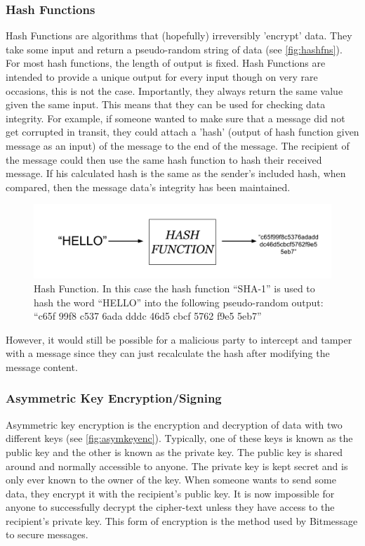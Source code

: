 \documentclass{article}
\begin{document}
\subsubsection{Hash Functions} \label{subsubsec:hashfns}
Hash Functions are algorithms that (hopefully) irreversibly 'encrypt' data. They take some input and return a pseudo-random string of data (see \autoref{fig:hashfns}). For most hash functions, the length of output is fixed. Hash Functions are intended to provide a unique output for every input though on very rare occasions, this is not the case. Importantly, they always return the same value given the same input. This means that they can be used for checking data integrity. For example, if someone wanted to make sure that a message did not get corrupted in transit, they could attach a 'hash' (output of hash function given message as an input) of the message to the end of the message. The recipient of the message could then use the same hash function to hash their received message. If his calculated hash is the same as the sender's included hash, when compared, then the message data's integrity has been maintained.
\begin{figure}[h]
    \centering
    \includegraphics[width=0.8\linewidth]{Images/Diagrams/hash_function.png}
    \caption{Hash Function. In this case the hash function ``SHA-1'' is used to hash the word ``HELLO'' into the following pseudo-random output: ``c65f 99f8 c537 6ada dddc 46d5 cbcf 5762 f9e5 5eb7''}
    \label{fig:hashfns}
\end{figure}

However, it would still be possible for a malicious party to intercept and tamper with a message since they can just recalculate the hash after modifying the message content.

\subsubsection{Asymmetric Key Encryption/Signing}
Asymmetric key encryption is the encryption and decryption of data with two different keys (see \autoref{fig:asymkeyenc}). Typically, one of these keys is known as the public key and the other is known as the private key. The public key is shared around and normally accessible to anyone. The private key is kept secret and is only ever known to the owner of the key. When someone wants to send some data, they encrypt it with the recipient's public key. It is now impossible for anyone to successfully decrypt the cipher-text unless they have access to the recipient's private key. This form of encryption is the method used by Bitmessage to secure messages. 
\end{document}
